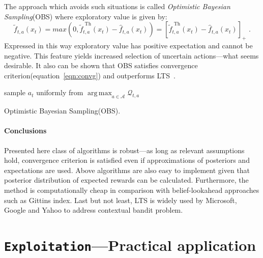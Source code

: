 \documentclass[12pt, a4paper, pdflatex, leqno]{report}
\begin{document}
The approach which avoids such situations is called \emph{Optimistic Bayesian Sampling}(OBS) where exploratory value is given by:
$$
  \tilde{f}_{t,a} (x_t) = max \left( 0, \tilde{f}_{t,a}^{\text{ Th}} (x_t) - \hat{f}_{t,a}(x_t) \right)
                        = \left [ \tilde{f}_{t,a}^{\text{ Th}} (x_t) - \hat{f}_{t,a}(x_t) \right]_+
                        \text{ .}
$$
Expressed in this way exploratory value has positive expectation and cannot be negative. This feature yields increased selection of uncertain actions---what seems desirable. It also can be shown that OBS satisfies convergence criterion(equation~\ref{eqn:convg}) and outperforms LTS~\citep{May:2012:OBS:2503308.2343711}.\\

\vspace{2cm}
\begin{algorithm}[H]
  sample $a_t$ uniformly from $\operatorname{arg\,max}_{a \in \mathscr{A}} \mathscr{Q}_{t,a}$ \;
 \caption{Optimistic Bayesian Sampling(OBS).\label{al:OBS}}
\end{algorithm}
\vspace{2cm}

\subsubsection{Conclusions}
Presented here class of algorithms is robust---as long as relevant assumptions hold, convergence criterion is satisfied even if approximations of posteriors and expectations are used. Above algorithms are also easy to implement given that posterior distribution of expected rewards can be calculated. Furthermore, the method is computationally cheap in comparison with belief-lookahead approaches such as Gittins index. Last but not least, LTS is widely used by Microsoft, Google and Yahoo to address contextual bandit problem.\\




\chapter{\texttt{\textbf{Exploitation}}---Practical application\label{ch:MAB-AL}}
\end{document}

